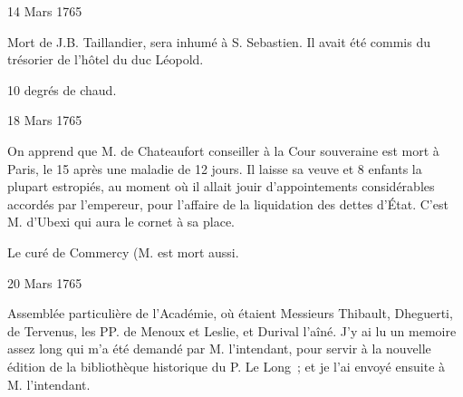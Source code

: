                      \begin{diary}{14 Mars 1765}{}
                        
                         Mort de J.B. Taillandier, sera inhumé à S. Sebastien.
                           Il avait été commis du trésorier de l'hôtel du duc Léopold. \bigskip
        
        
                        
                           10 degrés de chaud. \bigskip
        
        
                     \end{diary}

                     \begin{diary}{18 Mars 1765}{}
                        
                         On apprend que M. de Chateaufort
                           conseiller
                           à la Cour souveraine est mort à Paris, le 15 après
                           une maladie de 12 jours. Il laisse sa veuve
                           et 8 enfants la plupart estropiés, au moment
                           où il allait jouir d'appointements considérables
                           accordés par l'empereur, pour l'affaire de la
                           liquidation des dettes d’État. C'est M.
                              d'Ubexi
                           qui aura le cornet à sa place. \bigskip
        
        
                        
                           Le curé de Commercy (M. 
                           est mort aussi. \bigskip
        
        
                     \end{diary}


                     \begin{diary}{20 Mars 1765}{}
                        
                         Assemblée particulière de l'Académie, où
                           étaient Messieurs
                           Thibault, Dheguerti, de
                              Tervenus,
                           les PP. de Menoux et Leslie, et Durival l'aîné. J'y ai lu un
                           memoire assez long qui m'a
                           été demandé par M.
                              l'intendant, pour servir
                           à la nouvelle
                           édition de la bibliothèque
                           historique du P. Le Long ;
                           et je l'ai envoyé ensuite à M.
                              l'intendant. \bigskip
        
        

                     \end{diary}

